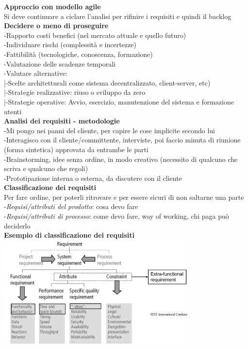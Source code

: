\documentclass{article}
\begin{document}
		\textbf{Approccio con modello agile}\\
		Si deve continuare a ciclare l'analisi per rifinire i requisiti e quindi il backlog\\
		
		\textbf{Decidere o meno di proseguire}\\
		-Rapporto costi benefici (nel mercato attuale e quello futuro)\\
		-Individuare rischi (complessità e incertezze)\\
		-Fattibilità (tecnologiche, conoscenza, formazione)\\
		-Valutazione delle scadenze temporali\\
		-Valutare alternative:\\
		|-Scelte architetturali come sistema decentralizzato, client-server, etc)\\
		|-Strategie realizzative: riuso o sviluppo da zero\\
		|-Strategie operative: Avvio, esercizio, manutenzione del sistema e formazione utenti\\
		
		\textbf{Analisi dei requisiti - metodologie}\\
		-Mi pongo nei panni del cliente, per capire le cose implicite secondo lui\\
		-Interagisco con il cliente/committente, interviste, poi faccio minuta di riunione (forma sintetica) approvata da entrambe le parti\\
		-Brainstorming, idee senza ordine, in modo creativo (necessito di qualcuno che scriva e qualcuno che regoli)\\
		-Prototipazione interna o esterna, da discutere con il cliente\\
		
		\textbf{Classificazione dei requisiti}\\
		Per fare ordine, per poterli ritrovare e per essere sicuri di non saltarne una parte\\
		-\textit{Requisi/attributi del prodotto}: cosa devo fare\\
		-\textit{Requisi/attributi di processo}: come devo fare, way of working, chi paga può deciderlo\\
		
		\textbf{Esempio di classificazione dei requisiti}\\
		\includegraphics[width=10cm]{classificazione_requisiti.jpg}\\
		
\end{document}
